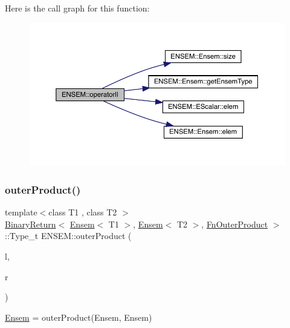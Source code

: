 Here is the call graph for this function\+:\nopagebreak
\begin{figure}[H]
\begin{center}
\leavevmode
\includegraphics[width=350pt]{d1/d9e/group__eensem_ga433f0b529c387d8299dd5c8eb5a9b3b0_cgraph}
\end{center}
\end{figure}
\mbox{\label{group__eensem_ga2e9659bc245cd1b2e76ef274c78e26a3}} 
\subsubsection{\texorpdfstring{outerProduct()}{outerProduct()}\hspace{0.1cm}{\footnotesize\ttfamily [1/3]}}
{\footnotesize\ttfamily template$<$class T1 , class T2 $>$ \\
\mbox{\hyperlink{structENSEM_1_1BinaryReturn}{Binary\+Return}}$<$ \mbox{\hyperlink{classENSEM_1_1Ensem}{Ensem}}$<$ T1 $>$, \mbox{\hyperlink{classENSEM_1_1Ensem}{Ensem}}$<$ T2 $>$, \mbox{\hyperlink{structENSEM_1_1FnOuterProduct}{Fn\+Outer\+Product}} $>$\+::Type\+\_\+t E\+N\+S\+E\+M\+::outer\+Product (\begin{DoxyParamCaption}\item[{const \mbox{\hyperlink{classENSEM_1_1Ensem}{Ensem}}$<$ T1 $>$ \&}]{l,  }\item[{const \mbox{\hyperlink{classENSEM_1_1Ensem}{Ensem}}$<$ T2 $>$ \&}]{r }\end{DoxyParamCaption})\hspace{0.3cm}{\ttfamily [inline]}}



\mbox{\hyperlink{classENSEM_1_1Ensem}{Ensem}} = outer\+Product(\+Ensem, Ensem) 

